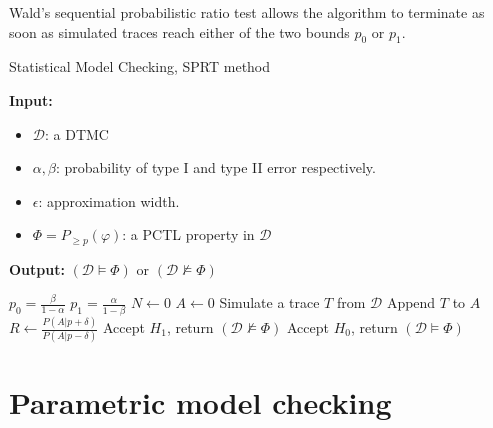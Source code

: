 Wald's sequential probabilistic ratio test allows the algorithm to terminate as soon as simulated
traces reach either of the two bounds $p_0$ or $p_1$.
\begin{algorithm}[H]
      \caption{Statistical Model Checking, SPRT method}
      \label{alg:smc-sprt}
      \footnotesize{
            \hspace*{\algorithmicindent} \textbf{Input:}
            \begin{itemize}[noitemsep,topsep=0pt]
                  \item $\mathcal{D}$: a DTMC
                  \item $\alpha, \beta$: probability of type I and type II error respectively.
                  \item $\epsilon$: approximation width.
                  \item $\Phi = P_{\geq p}(\varphi)$: a PCTL property in $\mathcal{D}$
            \end{itemize}
            \hspace*{\algorithmicindent} \textbf{Output:} $(\mathcal{D} \models \Phi)$ or $(\mathcal{D} \nvDash \Phi)$
      }
      \begin{algorithmic}[1]
            \State $p_0 = \frac{\beta}{1 - \alpha}$
            \State $p_1 = \frac{\alpha}{1 - \beta}$
            \State $N \leftarrow 0$
            \State $A \leftarrow 0$
            \State Simulate a trace $T$ from $\mathcal{D}$
            \State Append $T$ to $A$
            \EndIf
            \State $R \leftarrow \frac{P(A | p + \delta)}{P(A | p - \delta)}$
            \State Accept $H_1$, return $(\mathcal{D} \nvDash \Phi)$
            \Else
            \State Accept $H_0$, return $(\mathcal{D} \models \Phi)$
            \EndIf
            \EndIf
            \EndWhile
            \EndProcedure
      \end{algorithmic}
\end{algorithm}


\section{Parametric model checking}
